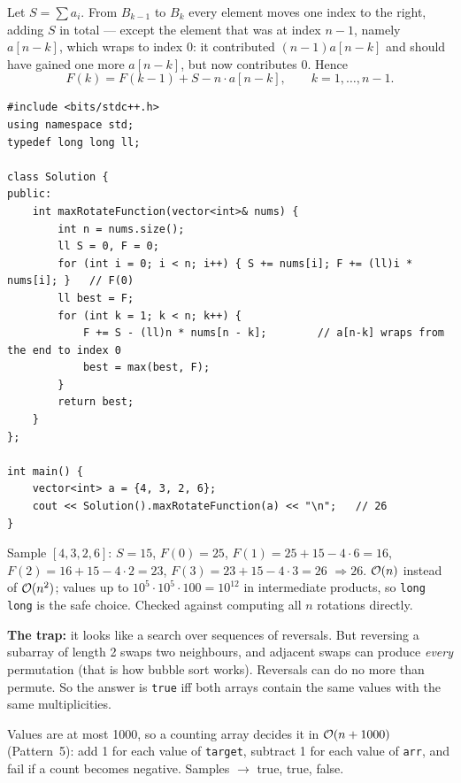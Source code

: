 \begin{solutionbox}
Let $S = \sum a_i$. From $B_{k-1}$ to $B_k$ every element moves one index to the right, adding $S$ in total --- except the element that was at index $n-1$, namely $a[n-k]$, which wraps to index 0: it contributed $(n-1)a[n-k]$ and should have gained one more $a[n-k]$, but now contributes $0$. Hence
\[
F(k) = F(k-1) + S - n \cdot a[n-k], \qquad k = 1, \dots, n-1 .
\]
\begin{lstlisting}[style=cpp]
#include <bits/stdc++.h>
using namespace std;
typedef long long ll;

class Solution {
public:
    int maxRotateFunction(vector<int>& nums) {
        int n = nums.size();
        ll S = 0, F = 0;
        for (int i = 0; i < n; i++) { S += nums[i]; F += (ll)i * nums[i]; }   // F(0)
        ll best = F;
        for (int k = 1; k < n; k++) {
            F += S - (ll)n * nums[n - k];        // a[n-k] wraps from the end to index 0
            best = max(best, F);
        }
        return best;
    }
};

int main() {
    vector<int> a = {4, 3, 2, 6};
    cout << Solution().maxRotateFunction(a) << "\n";   // 26
}
\end{lstlisting}
Sample $[4,3,2,6]$: $S = 15$, $F(0) = 25$, $F(1) = 25 + 15 - 4\cdot 6 = 16$, $F(2) = 16 + 15 - 4\cdot 2 = 23$, $F(3) = 23 + 15 - 4 \cdot 3 = 26$ $\Rightarrow 26$. $\mathcal{O}(n)$ instead of $\mathcal{O}(n^2)$; values up to $10^5 \cdot 10^5 \cdot 100 = 10^{12}$ in intermediate products, so \texttt{long long} is the safe choice. Checked against computing all $n$ rotations directly.
\end{solutionbox}

\begin{solutionbox}
\textbf{The trap:} it looks like a search over sequences of reversals. But reversing a subarray of length 2 swaps two neighbours, and adjacent swaps can produce \emph{every} permutation (that is how bubble sort works). Reversals can do no more than permute. So the answer is \texttt{true} iff both arrays contain the same values with the same multiplicities.
\begin{center}
\end{center}
Values are at most 1000, so a counting array decides it in $\mathcal{O}(n + 1000)$ (Pattern~5): add 1 for each value of \texttt{target}, subtract 1 for each value of \texttt{arr}, and fail if a count becomes negative. Samples $\to$ true, true, false.
\end{solutionbox}

